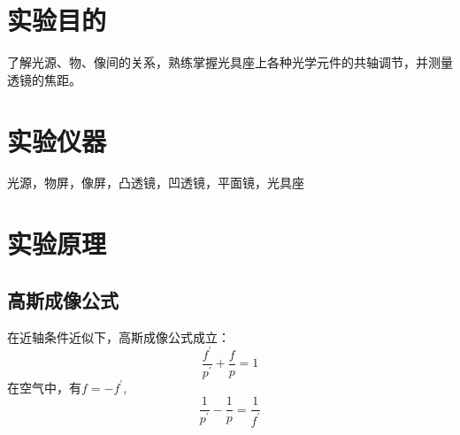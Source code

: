 \documentclass[12pt,a4paper]{article}
\begin{document}
	\section{实验目的}
	了解光源、物、像间的关系，熟练掌握光具座上各种光学元件的共轴调节，并测量透镜的焦距。

	\section{实验仪器}
	光源，物屏，像屏，凸透镜，凹透镜，平面镜，光具座

	\section{实验原理}
		\subsection{高斯成像公式}
			在近轴条件近似下，高斯成像公式成立：
			\begin{equation}
			\frac{f^{\prime}}{p^{\prime}} + \frac{f}{p} = 1
			\end{equation}
			在空气中，有$f = -f^{\prime}$, 
			\begin{equation}
			\frac{1}{p^{\prime}} - \frac{1}{p} = \frac{1}{f^{\prime}}
			\end{equation}
	
\end{document}
